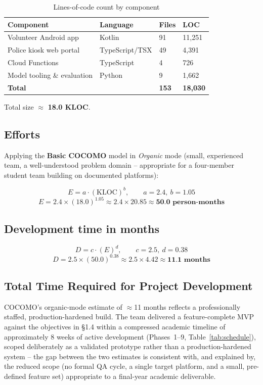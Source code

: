 \documentclass[12pt,a4paper,oneside]{report}
\begin{document}
\begin{table}[H]
\centering
\caption{Lines-of-code count by component}
\begin{tabular}{|p{4.6cm}|p{2.4cm}|p{2.4cm}|p{2.4cm}|}
\hline
\textbf{Component} & \textbf{Language} & \textbf{Files} & \textbf{LOC} \\
\hline
Volunteer Android app & Kotlin & 91 & 11{,}251 \\ \hline
Police kiosk web portal & TypeScript/TSX & 49 & 4{,}391 \\ \hline
Cloud Functions & TypeScript & 4 & 726 \\ \hline
Model tooling \& evaluation & Python & 9 & 1{,}662 \\
\hline
\textbf{Total} & & \textbf{153} & \textbf{18{,}030} \\
\hline
\end{tabular}
\end{table}

Total size $\approx$ \textbf{18.0 KLOC}.

\subsection{Efforts}

Applying the \textbf{Basic COCOMO} model \cite{cocomo} in \emph{Organic} mode (small,
experienced team, a well-understood problem domain -- appropriate for a
four-member student team building on documented platforms):

\[
E = a \cdot (\text{KLOC})^{b}, \qquad a = 2.4,\ b = 1.05
\]
\[
E = 2.4 \times (18.0)^{1.05} \approx 2.4 \times 20.85 \approx \textbf{50.0 person-months}
\]

\subsection{Development time in months}

\[
D = c \cdot (E)^{d}, \qquad c = 2.5,\ d = 0.38
\]
\[
D = 2.5 \times (50.0)^{0.38} \approx 2.5 \times 4.42 \approx \textbf{11.1 months}
\]

\subsection{Total Time Required for Project Development}

COCOMO's organic-mode estimate of $\approx$11 months reflects a
professionally staffed, production-hardened build. The team delivered a
feature-complete MVP against the objectives in \S1.4 within a compressed
academic timeline of approximately 8 weeks of active development (Phases~1--9,
Table~\ref{tab:schedule}), scoped deliberately as a validated prototype
rather than a production-hardened system -- the gap between the two
estimates is consistent with, and explained by, the reduced scope (no
formal QA cycle, a single target platform, and a small, pre-defined feature
set) appropriate to a final-year academic deliverable.
\end{document}
